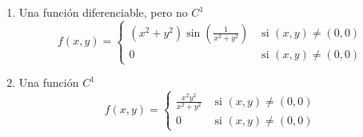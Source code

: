 \documentclass[12pt,a4paper]{article}
\newcommand{\si}{\text{ si }}
\begin{document}
\begin{enumerate}
    \item Una función diferenciable, pero no $C^1$
    \[f(x,y)=\begin{cases}
    (x^2+y^2)\sin\left(\frac{1}{x^2+y^2}\right) & \si (x,y)  \neq (0,0)\\
    0 & \si (x,y)  \neq (0,0)
    \end{cases}
    \]
    
    \item Una función $C^1$
    \[f(x,y)=\begin{cases}
    \frac{x^2y^2}{x^2+y^2} & \si (x,y)  \neq (0,0)\\
    0 & \si (x,y)  \neq (0,0)
    \end{cases}
    \]
\end{enumerate}
\end{document}
